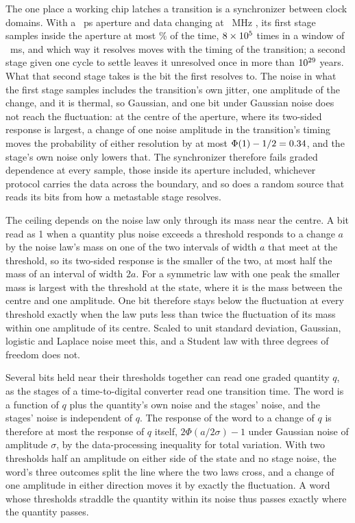 \documentclass[12pt]{article}
\begin{document}
The one place a working chip latches a transition is a synchronizer between
clock domains. With a \uSwAperturePs{}~ps aperture and data changing at
\uSwDataMHz{}~MHz \citep{ginosar2011}, its first stage samples inside the
aperture at most \uSwSyncPassPercent\% of the time, $8\times10^{5}$ times
in a window of \uOccContentLongMs{}~ms, and which way it resolves moves with the
timing of the transition; a second stage given one cycle to settle leaves it
unresolved once in more than $10^{29}$ years. What that second
stage takes is the bit the first resolves to. The noise in what the first stage
samples includes the transition's own jitter, one amplitude of the change, and
it is thermal, so Gaussian, and one bit under Gaussian noise does not reach the
fluctuation: at the centre of the aperture, where its two-sided response is
largest, a change of one noise amplitude in the transition's timing moves the
probability of either resolution by at most $\Phi(1)-1/2=0.34$,
and the stage's own noise only lowers that. The synchronizer therefore fails
graded dependence at every sample, those inside its aperture included,
whichever protocol carries the data across the boundary, and so does a random
source that reads its bits from how a metastable stage resolves.

The ceiling depends on the noise law only through its mass near the centre.
A bit read as 1 when a quantity plus noise exceeds a threshold responds to a
change $a$ by the noise law's mass on one of the two intervals of width $a$ that
meet at the threshold, so its two-sided response is the smaller of the two, at
most half the mass of an interval of width $2a$. For a symmetric law with one
peak the smaller mass is largest with the threshold at the state, where it is
the mass between the centre and one amplitude. One bit therefore stays below
the fluctuation at every threshold exactly when the law puts less than twice the
fluctuation of its mass within one amplitude of its centre. Scaled to unit
standard deviation, Gaussian, logistic and Laplace noise meet this, and a
Student law with three degrees of freedom does not.

Several bits held near their thresholds together can read one graded quantity
$q$, as the stages of a time-to-digital converter read one transition time.
The word is a function of $q$ plus the quantity's own noise and the stages'
noise, and the stages' noise is independent of $q$. The response of the word
to a change of $q$ is therefore at most the response of $q$ itself,
$2\Phi(a/2\sigma)-1$ under Gaussian noise of amplitude $\sigma$, by the
data-processing inequality for total variation. With two thresholds half an
amplitude on either side of the state and no stage noise, the word's three
outcomes split the line where the two laws cross, and a change of one amplitude
in either direction moves it by exactly the fluctuation. A word whose
thresholds straddle the quantity within its noise thus passes exactly where the
quantity passes.
\end{document}
